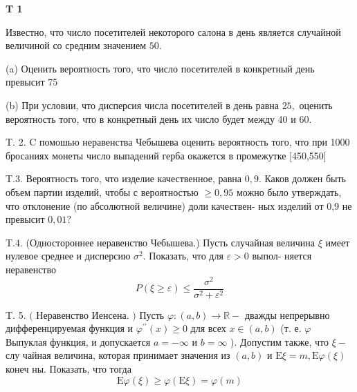 \documentclass[a4paper,12pt]{article} %
\begin{document}
\begin{example}\textbf{T 1}

Известно, что число посетителей некоторого салона в день является случайной величиной со средним значением $50 .$

(a) Оценить вероятность того, что число посетителей в конкретный день превысит 75

(b) При условии, что дисперсия числа посетителей в день равна $25,$ 
оценить вероятность того, что в конкретный день их число будет между 40 и $60 .$




\end{example}



\begin{example}

T. 2. $\mathrm{C}$ помошью неравенства Чебышева оценить вероятность того, что при 1000 бросаниях монеты число выпадений герба окажется в промежутке [450,550]




\end{example}



\begin{example}

T.3. 
Вероятность того, что изделие качественное, равна $0,9 .$ 
Каков должен быть объем партии изделий, чтобы с вероятностью $\geq 0,95$ можно было утверждать, что отклонение (по абсолютной величине) доли качествен-
ных изделий от 0,9 не превысит $0,01 ?$




\end{example}





\begin{example}


T.4. (Одностороннее неравенство Чебышева.) Пусть случайная величина $\xi$ имеет нулевое среднее и дисперсию $\sigma^{2} .$ Показать, что для $\varepsilon>0$ выпол-
няется неравенство
$$
P(\xi \geq \varepsilon) \leq \frac{\sigma^{2}}{\sigma^{2}+\varepsilon^{2}}
$$



\end{example}







\begin{example}


T. 5. $($ Неравенство Иенсена. $)$ Пусть $\varphi:(a, b) \rightarrow \mathbb{R}-$ дважды непрерывно дифференцируемая функция и $\varphi^{\prime \prime}(x) \geq 0$ для всех $x \in(a, b)$ (т. е. $\varphi$ Выпуклая функция, и допускается $a=-\infty$ и $b=\infty$ ). Допустим также, что $\xi-$ слу чайная величина, которая принимает значения из $(a, b)$ и $\mathrm{E} \xi=m, \mathrm{E} \varphi(\xi)$ конеч ны. Показать, что тогда
$$
\mathrm{E} \varphi(\xi) \geq \varphi(\mathrm{E} \xi)=\varphi(m)
$$



\end{example}
\end{document}
